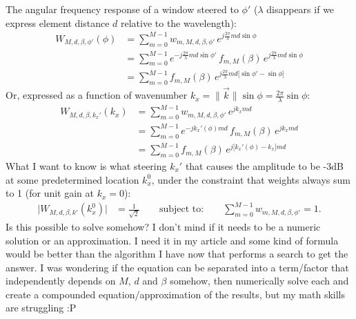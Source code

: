 \newpage
%
The angular frequency response of a window steered to $\phi'$ ($\lambda$ disappears if we express element distance $d$ relative to the wavelength):
%
\begin{align*}
W_{M,d,\beta,\phi'}(\phi) &= \sum\limits_{m=0}^{M-1} w_{m,M,d,\beta,\phi'}\, e^{j\frac{2\pi}{\lambda}md\sin\phi} \\
&= \sum\limits_{m=0}^{M-1} e^{-j\frac{2\pi}{\lambda}md\sin\phi'}\,f_{m,M}(\beta)\,e^{j\frac{2\pi}{\lambda}md\sin\phi} \\
&= \sum\limits_{m=0}^{M-1} f_{m,M}(\beta)\,e^{j\frac{2\pi}{\lambda}md\big[\sin\phi'-\sin\phi\big]}
\end{align*}
%
Or, expressed as a function of wavenumber $k_x = \|\vec k\|\sin\phi = \frac{2\pi}{\lambda}\sin\phi$:
%
\begin{align*}
W_{M,d,\beta,k_x'}(k_x) &= \sum\limits_{m=0}^{M-1} w_{m,M,d,\beta,\phi'}\, e^{jk_xmd} \\
&= \sum\limits_{m=0}^{M-1} e^{-jk_x'(\phi) md}\,f_{m,M}(\beta)\,e^{jk_xmd} \\
&= \sum\limits_{m=0}^{M-1} f_{m,M}(\beta)\,e^{j\big[k_x'(\phi)-k_x\big]md}
\end{align*}
%
What I want to know is what steering $k_x'$ that causes the amplitude to be -3dB at some predetermined location $k_x^0$, under the constraint that weights always sum to 1 (for unit gain at $k_x=0$):
%
\begin{align*}
\Big|W_{M,d,\beta,k'}(k_x^0)\Big| &= \frac{1}{\sqrt{2}} \quad\quad\text{subject to:}\quad\quad \sum\limits_{m=0}^{M-1} w_{m,M,d,\beta,\phi'} = 1.
\end{align*}
%
Is this possible to solve somehow? I don't mind if it needs to be a numeric solution or an approximation. I need it in my article and some kind of formula would be better than the algorithm I have now that performs a search to get the answer. I was wondering if the equation can be separated into a term/factor that independently depends on $M$, $d$ and $\beta$ somehow, then numerically solve each and create a compounded equation/approximation of the results, but my math skills are struggling :P


\newpage